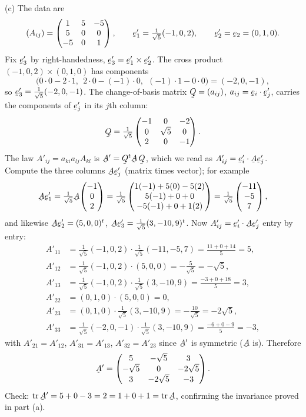 \begin{solution}
(c) The data are
\[
(A_{ij})=\begin{pmatrix}1&5&-5\\5&0&0\\-5&0&1\end{pmatrix},\qquad
\be'_1=\tfrac1{\sqrt5}(-1,0,2),\qquad \be'_2=\be_2=(0,1,0).
\]
Fix $\be'_3$ by right-handedness, $\be'_3=\be'_1\times\be'_2$. The cross
product $(-1,0,2)\times(0,1,0)$ has components
\[
\big(0\cdot0-2\cdot1,\ \ 2\cdot0-(-1)\cdot0,\ \ (-1)\cdot1-0\cdot0\big)
=(-2,0,-1),
\]
so $\be'_3=\tfrac1{\sqrt5}(-2,0,-1)$. The change-of-basis matrix
$\bQ=(a_{ij})$, $a_{ij}=\ip{\be_i}{\be'_j}$, carries the components of
$\be'_j$ in its $j$th column:
\[
\bQ=\tfrac1{\sqrt5}\begin{pmatrix}-1&0&-2\\0&\sqrt5&0\\2&0&-1\end{pmatrix}.
\]
The law $A'_{ij}=a_{ki}a_{lj}A_{kl}$ is $\bA'=\bQ^{t}\bA\,\bQ$, which we read
as $A'_{ij}=\ip{\be'_i}{\bA\be'_j}$. Compute the three columns $\bA\be'_j$
(matrix times vector); for example
\[
\bA\be'_1=\tfrac1{\sqrt5}\bA\!\begin{pmatrix}-1\\0\\2\end{pmatrix}
=\tfrac1{\sqrt5}\begin{pmatrix}1(-1)+5(0)-5(2)\\5(-1)+0+0\\-5(-1)+0+1(2)\end{pmatrix}
=\tfrac1{\sqrt5}\begin{pmatrix}-11\\-5\\7\end{pmatrix},
\]
and likewise
$\bA\be'_2=(5,0,0)^t$,
$\bA\be'_3=\tfrac1{\sqrt5}(3,-10,9)^t$. Now
$A'_{ij}=\ip{\be'_i}{\bA\be'_j}$ entry by entry:
\[
\begin{aligned}
A'_{11}&=\tfrac1{\sqrt5}(-1,0,2)\!\cdot\!\tfrac1{\sqrt5}(-11,-5,7)
=\tfrac{11+0+14}{5}=5,\\
A'_{12}&=\tfrac1{\sqrt5}(-1,0,2)\!\cdot\!(5,0,0)=-\tfrac{5}{\sqrt5}=-\sqrt5,\\
A'_{13}&=\tfrac1{\sqrt5}(-1,0,2)\!\cdot\!\tfrac1{\sqrt5}(3,-10,9)
=\tfrac{-3+0+18}{5}=3,\\
A'_{22}&=(0,1,0)\!\cdot\!(5,0,0)=0,\\
A'_{23}&=(0,1,0)\!\cdot\!\tfrac1{\sqrt5}(3,-10,9)=-\tfrac{10}{\sqrt5}=-2\sqrt5,\\
A'_{33}&=\tfrac1{\sqrt5}(-2,0,-1)\!\cdot\!\tfrac1{\sqrt5}(3,-10,9)
=\tfrac{-6+0-9}{5}=-3,
\end{aligned}
\]
with $A'_{21}=A'_{12}$, $A'_{31}=A'_{13}$, $A'_{32}=A'_{23}$ since $\bA'$ is
symmetric ($\bA$ is). Therefore
\[
\bA'=\begin{pmatrix}5&-\sqrt5&3\\-\sqrt5&0&-2\sqrt5\\3&-2\sqrt5&-3\end{pmatrix}.
\]
Check: $\tr\bA'=5+0-3=2=1+0+1=\tr\bA$, confirming the invariance proved in
part (a).
\end{solution}

